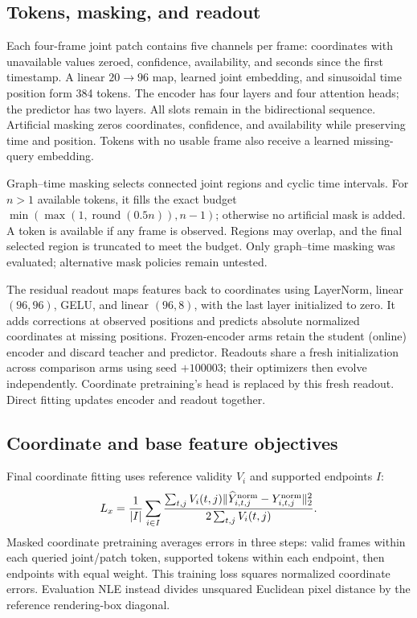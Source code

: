 \subsection{Tokens, masking, and readout}
Each four-frame joint patch contains five channels per frame: coordinates with unavailable values zeroed, confidence, availability, and seconds since the first timestamp. A linear $20\to96$ map, learned joint embedding, and sinusoidal time position form 384 tokens. The encoder has four layers and four attention heads; the predictor has two layers. All slots remain in the bidirectional sequence. Artificial masking zeros coordinates, confidence, and availability while preserving time and position. Tokens with no usable frame also receive a learned missing-query embedding.

Graph--time masking selects connected joint regions and cyclic time intervals. For $n>1$ available tokens, it fills the exact budget $\min(\max(1,\operatorname{round}(0.5n)),n-1)$; otherwise no artificial mask is added. A token is available if any frame is observed. Regions may overlap, and the final selected region is truncated to meet the budget. Only graph--time masking was evaluated; alternative mask policies remain untested.

The residual readout maps features back to coordinates using LayerNorm, linear $(96,96)$, GELU, and linear $(96,8)$, with the last layer initialized to zero. It adds corrections at observed positions and predicts absolute normalized coordinates at missing positions. Frozen-encoder arms retain the student (online) encoder and discard teacher and predictor. Readouts share a fresh initialization across comparison arms using seed $+100003$; their optimizers then evolve independently. Coordinate pretraining's head is replaced by this fresh readout. Direct fitting updates encoder and readout together.

\subsection{Coordinate and base feature objectives}
Final coordinate fitting uses reference validity $V_i$ and supported endpoints $I$:
\begin{equation}
L_x=\frac{1}{|I|}\sum_{i\in I}
\frac{\sum_{t,j}V_i(t,j)\|\widehat Y_{i,t,j}^{\rm norm}-Y_{i,t,j}^{\rm norm}\|_2^2}
{2\sum_{t,j}V_i(t,j)}.
\end{equation}
Masked coordinate pretraining averages errors in three steps: valid frames within each queried joint/patch token, supported tokens within each endpoint, then endpoints with equal weight. This training loss squares normalized coordinate errors. Evaluation NLE instead divides unsquared Euclidean pixel distance by the reference rendering-box diagonal.

